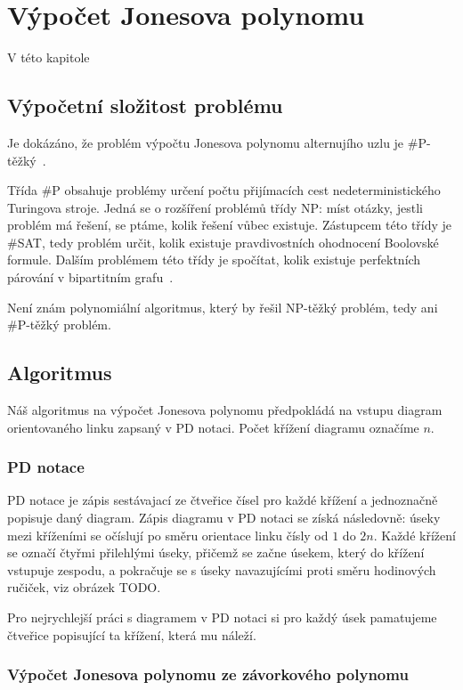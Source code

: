 \chapter{Výpočet Jonesova polynomu}
V této kapitole

\section{Výpočetní složitost problému} 

Je dokázáno, že problém výpočtu Jonesova polynomu alternujího uzlu je \mbox{\#P-těžký}~\cite{jaeger_vertigan_welsh_1990}. 

Třída \#P obsahuje problémy určení počtu přijímacích cest nedeterministického Turingova stroje. Jedná se o rozšíření problémů třídy NP: míst otázky, jestli problém má řešení, se ptáme, kolik řešení vůbec existuje. Zástupcem této třídy je \#SAT, tedy problém určit, kolik existuje pravdivostních ohodnocení Boolovské formule. Dalším problémem této třídy je spočítat, kolik  existuje perfektních párování v bipartitním grafu~\cite{zoo}.

Není znám polynomiální algoritmus, který by řešil NP-těžký problém, tedy ani \#P-těžký problém.

\section{Algoritmus}
Náš algoritmus na výpočet Jonesova polynomu předpokládá na vstupu diagram orientovaného linku zapsaný v PD notaci. Počet křížení diagramu označíme $n$.

\subsection{PD notace} 

PD notace je zápis sestávajací ze čtveřice čísel pro každé křížení a jednoznačně popisuje daný diagram. Zápis diagramu v PD notaci se získá následovně: úseky mezi kříženími se očíslují po směru orientace linku čísly od $1$ do $2 n$. Každé křížení se označí čtyřmi přilehlými úseky, přičemž se začne úsekem, který do křížení vstupuje zespodu, a pokračuje se s úseky navazujícími proti směru hodinových ručiček, viz obrázek TODO.

Pro nejrychlejší práci s diagramem v PD notaci si pro každý úsek pamatujeme čtveřice popisující ta křížení, která mu náleží.

\subsection{Výpočet Jonesova polynomu ze závorkového polynomu} \label{jones}

